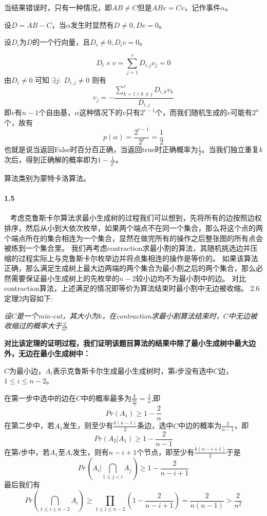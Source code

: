 当结果错误时，只有一种情况，即$AB \ne C$但是$ABv=Cv$，记作事件$\alpha$。

设$D=AB-C$，当$\alpha$发生时显然有$D \ne 0, Dv = 0$。

设$D_i$为$D$的一个行向量，且$D_i \ne 0, D_iv = 0$。

$$D_i \times v = \sum_{j=1}^{r}D_{i,j}v_j = 0$$
由$D_i \ne 0$ 可知 $\exists j: \; D_{i,j} \ne 0$
则有
$$v_j=- \frac{\sum_{k=1 \land k \ne j}^{r}D_{i,k}v_k}{D_{i,j}}$$
即$v$有$n-1$个自由基，$\alpha$这种情况下的$v$只有$2^{r-1}$个，而我们随机生成的$v$可能有$2^n$个，故有
$$p(\alpha) = \frac{2^{r-1}}{2^r}=\frac{1}{2}$$
也就是说当返回False时百分百正确，当返回true时正确概率为$\frac{1}{2}$。当我们独立重复$k$次后，得到正确解的概率即为$1-\frac{1}{2^k}$。

算法类别为蒙特卡洛算法。

\paragraph{1.5}~{}
考虑克鲁斯卡尔算法求最小生成树的过程我们可以想到，先将所有的边按照边权排序，然后从小到大依次枚举，如果两个端点不在同一个集合，那么将这个点的两个端点所在的集合相连为一个集合，显然在做完所有的操作之后整张图的所有点会被练到一个集合里。
我们再考虑contraction求最小割的算法，其随机挑选边并压缩的过程实际上与克鲁斯卡尔枚举边并将点集相连的操作是等价的。
如果该算法正确，那么满足生成树上最大边两端的两个集合为最小割之后的两个集合，那么必然需要保证最小生成树上的先枚举的$n-2$较小边均不为最小割中的边。
对比contraction算法，上述满足的情况即等价为算法结束时最小割中无边被收缩。
2.6定理2内容如下:

\quad \quad \emph{设$C$是一个min-cut，其大小为$k$，在contraction求最小割算法结束时，$C$中无边被收缩过的概率大于$\frac{2}{n^2}$}

\textbf{对比该定理的证明过程，我们证明该题目算法的结果中除了最小生成树中最大边外，无边在最小生成树中：}

$C$为最小边，$A_i$表示克鲁斯卡尔生成最小生成树时，第$i$步没有选中$C$边，$1 \le i \le n-2$。

在第一步中选中的边在$C$中的概率最多为$\frac{k}{\frac{kn}{2}}=\frac{2}{n}$,即
$$Pr(A_1) \ge 1-\frac{2}{n}$$
在第二步中，若$A_1$发生，则至少有$\frac{k(n-1)}{2}$条边，选中$C$中边的概率为$\frac{2}{n-1}$，即
$$Pr(A_2|A_1) \ge 1-\frac{2}{n-1}$$
在第$i$步中，若$A_1$至$A_i$发生，则有$n-i+1$个节点，即至少有$\frac{k(n-i+1)}{2}$于是
$$Pr(A_i|\bigcap_{1 \le j < i}A_j) \ge 1-\frac{2}{n-i+1}$$
最后我们有
$$Pr(\bigcap_{1 \le i \le n-2}A_i) \ge \prod_{1 \le i \le n-2}(1-\frac{2}{n-i+1})=\frac{2}{n(n-1)}>\frac{2}{n^2}$$


